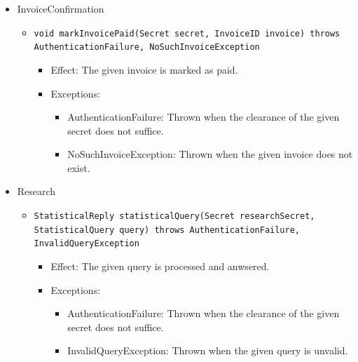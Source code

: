\documentclass[a4paper,10pt]{article}
\begin{document}
\begin{itemize}
    \item InvoiceConfirmation
    \begin{itemize}
    	\item \texttt{void markInvoicePaid(Secret secret, InvoiceID invoice) throws AuthenticationFailure, NoSuchInvoiceException}
        \begin{itemize}
        	\item Effect: The given invoice is marked as paid.
            \item Exceptions:
            \begin{itemize}
            	\item AuthenticationFailure: Thrown when the clearance of the given secret does not suffice.
            	\item NoSuchInvoiceException: Thrown when the given invoice does not exist.
           	\end{itemize}
        \end{itemize}
    \end{itemize}
    
    \item Research
    \begin{itemize}
    	\item \texttt{StatisticalReply statisticalQuery(Secret researchSecret, StatisticalQuery query) throws AuthenticationFailure, InvalidQueryException}
        \begin{itemize}
        	\item Effect: The given query is processed and anwsered.
            \item Exceptions:
            \begin{itemize}
            	\item AuthenticationFailure: Thrown when the clearance of the given secret does not suffice.
            	\item InvalidQueryException: Thrown when the given query is unvalid.
           	\end{itemize}
        \end{itemize}
    \end{itemize}
\end{itemize}
\end{document}
